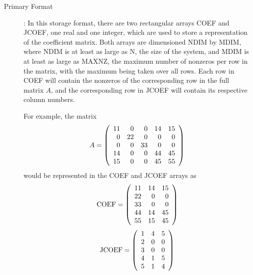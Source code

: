  
\begin{description}
\newpage
\item[Primary  Format]:
  In this storage format, there are two rectangular arrays COEF and
  JCOEF,
  one real and one integer, which are used to store a representation
  of the coefficient matrix.  Both arrays are dimensioned NDIM by
  MDIM, where NDIM is at least as large as N, the size of the system,
  and MDIM is at least as large as MAXNZ, the maximum number of
  nonzeros per row in the matrix, with the maximum being taken over
  all rows.  Each row in COEF will contain the nonzeros of the
  corresponding row in the full matrix $A$, and the corresponding
  row in JCOEF will contain its respective column numbers.
 
     For example, the matrix
  \[
     A = \left( \begin{array}{rrrrr}
                 11 &  0 &  0 & 14 & 15 \\
                  0 & 22 &  0 &  0 &  0 \\
                  0 &  0 & 33 &  0 &  0 \\
                 14 &  0 &  0 & 44 & 45 \\
                 15 &  0 &  0 & 45 & 55
        \end{array} \right)
  \]
  would be represented in the COEF and JCOEF arrays as
  \[
     \mbox{COEF} = \left( \begin{array}{rrr}
            11 & 14 & 15 \\
            22 &  0 &  0 \\
            33 &  0 &  0 \\
            44 & 14 & 45 \\
            55 & 15 & 45
      \end{array} \right)
  \]
  \[
     \mbox{JCOEF} = \left( \begin{array}{rrr}
             1 & 4 & 5 \\
             2 & 0 & 0 \\
             3 & 0 & 0 \\
             4 & 1 & 5 \\
             5 & 1 & 4
      \end{array} \right)
  \]
 

\end{description}
